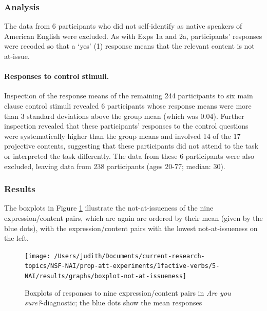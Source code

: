 \documentclass[11pt,fleqn]{article}
\newcommand{\6}{\mbox{$[\hspace*{-.6mm}[$}}
\newcommand{\9}{\mbox{$]\hspace*{-.6mm}]$}}
\begin{document}
\subsubsection{Analysis}

The data from 6 participants who did not self-identify as native speakers of American English were excluded. As with Exps 1a and 2a, participants' responses were recoded so that a `yes' (1) response means that the relevant content is not at-issue.

\paragraph{Responses to control stimuli.} 
Inspection of the response means of the remaining 244 participants to six main clause control stimuli revealed 6 participants whose response means were more than 3 standard deviations above the group mean (which was 0.04). Further inspection revealed that these participants' responses to the control questions were systematically higher than the group means and involved 14 of the 17 projective contents, suggesting that these participants did not attend to the task or interpreted the task differently. The data from these 6 participants were also excluded, leaving data from 238 participants (ages 20-77; median: 30). 

\subsubsection{Results}

The boxplots in Figure \ref{f-exp2a} illustrate the not-at-issueness of the nine expression/content pairs, which are again are ordered by their mean (given by the blue dots), with the expression/content pairs with the lowest not-at-issueness on the left. 

\begin{figure}[!h]

\begin{center}

\texttt{[image: /Users/judith/Documents/current-research-topics/NSF-NAI/prop-att-experiments/1factive-verbs/5-NAI/results/graphs/boxplot-not-at-issueness]}
\end{center}

\caption{Boxplots of responses to nine expression/content pairs in {\em Are you sure?}-diagnostic; the blue dots show the mean responses}\label{f-exp2a}
\end{figure}
\end{document}

